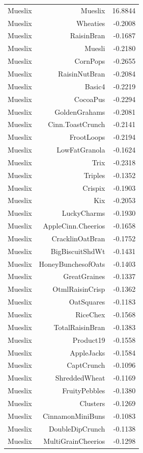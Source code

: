 \begin{longtable}{@{}lrr@{}}
Mueslix & Mueslix & 16.8844 \\
Mueslix & Wheaties & -0.2008 \\
Mueslix & RaisinBran & -0.1687 \\
Mueslix & Muesli & -0.2180 \\
Mueslix & CornPops & -0.2655 \\
Mueslix & RaisinNutBran & -0.2084 \\
Mueslix & Basic4 & -0.2219 \\
Mueslix & CocoaPus & -0.2294 \\
Mueslix & GoldenGrahams & -0.2081 \\
Mueslix & Cinn.ToastCrunch & -0.2141 \\
Mueslix & FrootLoops & -0.2194 \\
Mueslix & LowFatGranola & -0.1624 \\
Mueslix & Trix & -0.2318 \\
Mueslix & Triples & -0.1352 \\
Mueslix & Crispix & -0.1903 \\
Mueslix & Kix & -0.2053 \\
Mueslix & LuckyCharms & -0.1930 \\
Mueslix & AppleCinn.Cheerios & -0.1658 \\
Mueslix & CracklinOatBran & -0.1752 \\
Mueslix & BigBiscuitShdWt & -0.1431 \\
Mueslix & HoneyBunchesofOats & -0.1403 \\
Mueslix & GreatGraines & -0.1337 \\
Mueslix & OtmlRaisinCrisp & -0.1362 \\
Mueslix & OatSquares & -0.1183 \\
Mueslix & RiceChex & -0.1568 \\
Mueslix & TotalRaisinBran & -0.1383 \\
Mueslix & Product19 & -0.1558 \\
Mueslix & AppleJacks & -0.1584 \\
Mueslix & CaptCrunch & -0.1096 \\
Mueslix & ShreddedWheat & -0.1169 \\
Mueslix & FruityPebbles & -0.1380 \\
Mueslix & Clusters & -0.1269 \\
Mueslix & CinnamonMiniBuns & -0.1083 \\
Mueslix & DoubleDipCrunch & -0.1138 \\
Mueslix & MultiGrainCheerios & -0.1298 \\

\end{longtable}
